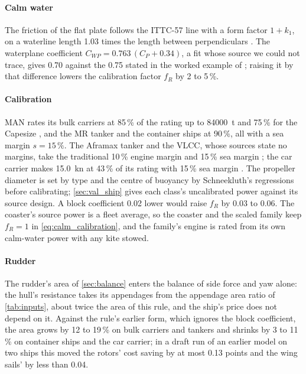 \paragraph{Calm water} The friction of the flat plate follows the ITTC-57 line with a form factor $1+k_1$, on a waterline length 1.03 times the length between perpendiculars \citep{man2011}. The waterplane coefficient $C_{WP}=0.763\,(C_P+0.34)$, a fit whose source we could not trace, gives 0.70 against the 0.75 stated in the worked example of \citet{holtrop1982}; raising it by that difference lowers the calibration factor $f_R$ by 2 to 5\,\%.

\paragraph{Calibration}
\label{app:calm_calibration}
MAN rates its bulk carriers at 85\,\% of the rating up to \num{84000}~t and 75\,\% for the Capesize \citep{man2022bulk}, and the MR tanker \citep{man2019mr} and the container ships \citep{man2024container} at 90\,\%, all with a sea margin $s=15\,\%$. The Aframax tanker and the VLCC, whose sources state no margins, take the traditional 10\,\% engine margin and 15\,\% sea margin \citep{man2011}; the car carrier makes \SI{15.0}{kn} at 43\,\% of its rating with 15\,\% sea margin \citep{keh_8600ceu_df_pctc}. The propeller diameter is set by type and the centre of buoyancy by Schneekluth's regressions \citep{ventura_estimation} before calibrating; \cref{sec:val_ship} gives each class's uncalibrated power against its source design. A block coefficient 0.02 lower would raise $f_R$ by 0.03 to 0.06. The coaster's source power is a fleet average, so the coaster and the scaled family keep $f_R=1$ in \cref{eq:calm_calibration}, and the family's engine is rated from its own calm-water power with any kite stowed.

\paragraph{Rudder} The rudder's area of \cref{sec:balance} enters the balance of side force and yaw alone: the hull's resistance takes its appendages from the appendage area ratio of \cref{tab:inputs}, about twice the area of this rule, and the ship's price does not depend on it. Against the rule's earlier form, which ignores the block coefficient, the area grows by 12 to 19\,\% on bulk carriers and tankers and shrinks by 3 to 11\,\% on container ships and the car carrier; in a draft run of an earlier model on two ships this moved the rotors' cost saving by at most 0.13 points and the wing sails' by less than 0.04.

